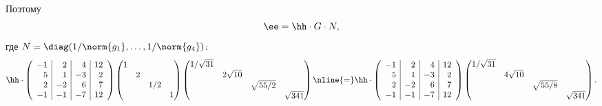 \begin{solution}
	Поэтому
	\[
		\ee = \hh \cdot G \cdot N,
	\]
	где $N = \diag(1/\norm{g_1}, \dots, 1/\norm{g_4})$:
	\begin{multline*}
		\hh \cdot
		\left( 
			\begin{array}{r|r|r|r}
				-1 &  2 &  4 & 12 \\
				 5 &  1 & -3 &  2 \\
				 2 & -2 &  6 &  7 \\
				-1 & -1 & -7 & 12
			\end{array}
		\right)
		\begin{pmatrix}
			1 \\
			& 2 \\
			&& 1/2 \\
			&&& 1
		\end{pmatrix}
		\begin{pmatrix}
			1/\sqrt{31} \\
			& 2\sqrt{10} \\
			&& \sqrt{55/2} \\
			&&& \sqrt{341}
		\end{pmatrix}
		\nline{=}
		\hh \cdot
		\left( 
			\begin{array}{r|r|r|r}
				-1 &  2 &  4 & 12 \\
				 5 &  1 & -3 &  2 \\
				 2 & -2 &  6 &  7 \\
				-1 & -1 & -7 & 12
			\end{array}
		\right)
		\begin{pmatrix}
			1/\sqrt{31} \\
			& 4\sqrt{10} \\
			&& \sqrt{55/8} \\
			&&& \sqrt{341}
		\end{pmatrix}
		.
	\end{multline*}
\end{solution}
